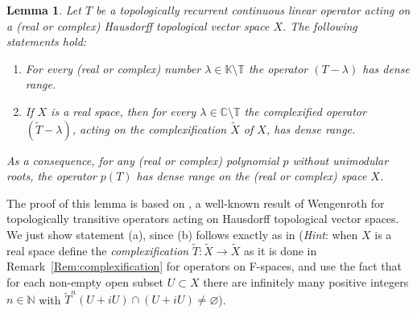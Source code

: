 \documentclass[openright,11pt]{article}
\theoremstyle{plain}
\newtheorem{lemma}[theorem]{Lemma}
\theoremstyle{definition}
\newcommand{\NN}{\mathbb{N}}
\newcommand{\CC}{\mathbb{C}}
\newcommand{\KK}{\mathbb{K}}
\newcommand{\TT}{\mathbb{T}}
\newcommand{\til}{\widetilde} %
\begin{document}
\begin{lemma}\label{Lem:poly-dense-range}
	Let $T$ be a topologically recurrent continuous linear operator acting on a (real or complex) Hausdorff topological vector space $X$. The following statements hold:
	\begin{enumerate}[{\em(a)}]
		\item For every (real or complex) number $\lambda \in \KK\setminus\TT$ the operator $(T-\lambda)$ has dense range.
		
		\item If $X$ is a real space, then for every $\lambda \in \CC\setminus\TT$ the complexified operator $(\til{T}-\lambda)$, acting on the complexification $\til{X}$ of $X$, has dense range.
	\end{enumerate}
	As a consequence, for any (real or complex) polynomial $p$ without unimodular roots, the operator $p(T)$ has dense range on the (real or complex) space $X$.
\end{lemma}\newpage
The proof of this lemma is based on \cite[Lemma 12.13]{GrPe2011_book}, a well-known result of Wengenroth for topologically transitive operators acting on Hausdorff topological vector spaces. We just show statement (a), since (b) follows exactly as in \cite[Exercise 12.2.6]{GrPe2011_book} ({\em Hint}: when $X$ is a real space define the {\em complexification} $\til{T}:\til{X}\longrightarrow \til{X}$ as it is done in Remark~\ref{Rem:complexification} for operators on F-spaces, and use the fact that for each non-empty open subset $U \subset X$ there are infinitely many positive integers $n \in \NN$ with $\til{T}^n(U+iU)\cap(U+iU)\neq\varnothing$).%
\end{document}

